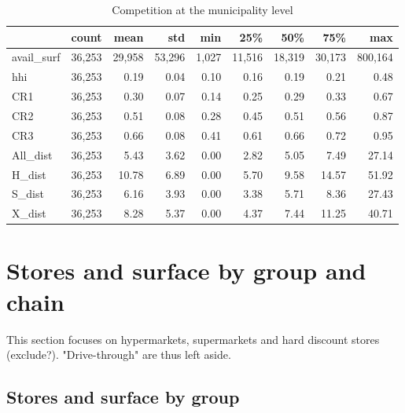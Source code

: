\documentclass[11pt]{article}
\begin{document}
\begin{table}[H]
\caption{Competition at the municipality level}
\small

\begin{tabular}{lrrrrrrrr}
\toprule
{} &      count &       mean &        std &        min &        25\% &        50\% &        75\% &        max \\
\midrule
avail\_surf &  36,253 &  29,958 &  53,296 &   1,027 &  11,516 &  18,319 &  30,173 & 800,164 \\
hhi        &  36,253 &       0.19 &       0.04 &       0.10 &       0.16 &       0.19 &       0.21 &       0.48 \\
CR1        &  36,253 &       0.30 &       0.07 &       0.14 &       0.25 &       0.29 &       0.33 &       0.67 \\
CR2        &  36,253 &       0.51 &       0.08 &       0.28 &       0.45 &       0.51 &       0.56 &       0.87 \\
CR3        &  36,253 &       0.66 &       0.08 &       0.41 &       0.61 &       0.66 &       0.72 &       0.95 \\
All\_dist   &  36,253 &       5.43 &       3.62 &       0.00 &       2.82 &       5.05 &       7.49 &      27.14 \\
H\_dist     &  36,253 &      10.78 &       6.89 &       0.00 &       5.70 &       9.58 &      14.57 &      51.92 \\
S\_dist     &  36,253 &       6.16 &       3.93 &       0.00 &       3.38 &       5.71 &       8.36 &      27.43 \\
X\_dist     &  36,253 &       8.28 &       5.37 &       0.00 &       4.37 &       7.44 &      11.25 &      40.71 \\
\bottomrule
\end{tabular}

\end{table}

\section{Stores and surface by group and chain}

This section focuses on hypermarkets, supermarkets and hard discount stores (exclude?). "Drive-through" are thus left aside.

\subsection{Stores and surface by group}
\end{document}
